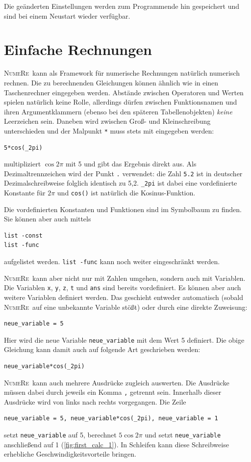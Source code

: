 \documentclass[DIV=14,headsepline,footsepline]{scrbook}
\newcommand{\NR}{\textsc{Nu\-me\-Re}}
\begin{document}
				Die geänderten Einstellungen werden zum Programmende hin gespeichert und sind bei einem Neustart wieder verfügbar.
			\section{Einfache Rechnungen}
				\NR\ kann als Framework für numerische Rechnungen natürlich numerisch rechnen. Die zu berechnenden Gleichungen können ähnlich wie in einen Taschenrechner eingegeben werden. Abstände zwischen Operatoren und Werten spielen natürlich keine Rolle, allerdings dürfen zwischen Funktionsnamen und ihren Argumentklammern (ebenso bei den späteren Tabellenobjekten) \emph{keine} Leerzeichen sein. Daneben wird zwischen Groß- und Kleinschreibung unterschieden und der Malpunkt \verb+*+ muss stets mit eingegeben werden:
				\begin{lstlisting}
5*cos(_2pi)
				\end{lstlisting}
				multipliziert $\cos2\pi$ mit 5 und gibt das Ergebnis direkt aus. Als Dezimaltrennzeichen wird der Punkt \verb+.+ verwendet: die Zahl \verb+5.2+ ist in deutscher Dezimalschreibweise folglich identisch zu 5,2. \verb+_2pi+ ist dabei eine vordefinierte Konstante für $2\pi$ und \verb+cos()+ ist natürlich die Kosinus-Funktion.

				Die vordefinierten Konstanten und Funktionen sind im Symbolbaum zu finden. Sie können aber auch mittels 
				\begin{lstlisting}
list -const
list -func
				\end{lstlisting}
				aufgelistet werden. \verb+list -func+ kann noch weiter eingeschränkt werden.
				
				\NR\ kann aber nicht nur mit Zahlen umgehen, sondern auch mit Variablen. Die Variablen \verb+x+, \verb+y+, \verb+z+, \verb+t+ und \verb+ans+ sind bereits vordefiniert. Es können aber auch weitere Variablen definiert werden. Das geschieht entweder automatisch (sobald \NR\ auf eine unbekannte Variable stößt) oder durch eine direkte Zuweisung:
				\begin{lstlisting}
neue_variable = 5
				\end{lstlisting}
				Hier wird die neue Variable \verb+neue_variable+ mit dem Wert 5 definiert. Die obige Gleichung kann damit auch auf folgende Art geschrieben werden:
				\begin{lstlisting}
neue_variable*cos(_2pi)
				\end{lstlisting}
				
				\NR\ kann auch mehrere Ausdrücke zugleich auswerten. Die Ausdrücke müssen dabei durch jeweils ein Komma \verb+,+ getrennt sein. Innerhalb dieser Ausdrücke wird von links nach rechts vorgegangen. Die Zeile 
				\begin{lstlisting}
neue_variable = 5, neue_variable*cos(_2pi), neue_variable = 1
				\end{lstlisting}
				setzt \verb+neue_variable+ auf 5, berechnet $5\cos2\pi$ und setzt \verb+neue_variable+ anschließend auf 1 (\autoref{fig:first_calc_1}). In Schleifen kann diese Schreibweise erhebliche Geschwindigkeitsvorteile bringen.
				
\end{document}
